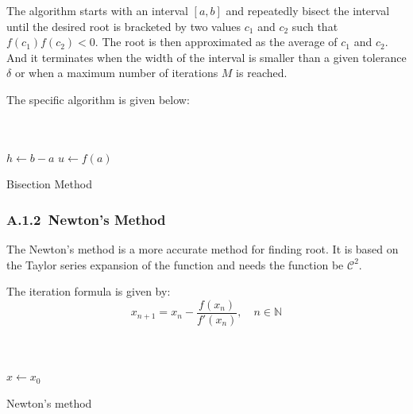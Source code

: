 \documentclass[a4paper]{article}
\begin{document}
The algorithm starts with an interval $[a, b]$ and repeatedly bisect the interval until the desired root is bracketed by two values $c_1$ and $c_2$ such that $f(c_1)f(c_2) < 0$. The root is then approximated as the average of $c_1$ and $c_2$. 
And it terminates when the width of the interval is smaller than a given tolerance $\delta$ or when a maximum number of iterations $M$ is reached.

The specific algorithm is given below:

\begin{algorithm}[H]
  \\
  \\
  \BlankLine
  \LinesNumbered
  $h \leftarrow b - a$\;
  $u \leftarrow f(a)$\;
  \caption{Bisection Method}
  \label{al:Bisection_method}
\end{algorithm}

\subsubsection*{A.1.2\ Newton's Method}

The Newton's method is a more accurate method for finding root. It is based on the Taylor series expansion of the function and needs the function be $\mathcal{C}^2$.

The iteration formula is given by:
\begin{equation}
  x_{n + 1} = x_n - \frac{f(x_n)}{f'(x_n)}, \quad n \in \mathbb{N}
  \label{eq:Newton_method}
\end{equation}

\begin{algorithm}[H]
  \\
  \\
  \BlankLine
  \LinesNumbered
  $x \leftarrow x_0$\;
  \caption{Newton's method}
  \label{al:Newton_method}
\end{algorithm}
\end{document}
